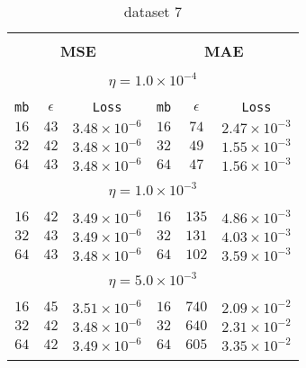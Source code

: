 \begin{table}[]
  \small
  
\begin{center}
\caption{dataset 7}\label{tab:mae2}
\begin{tabular}{@{}ccc|ccc@{}}

\hline\\[-11pt]
\hline\\[-6.5pt]
\multicolumn{3}{c}{\bf MSE} & \multicolumn{3}{c}{\bf MAE } \\[5pt]
\hline\\[-11pt]
\multicolumn{6}{c}{$\eta = 1.0\times 10^{-4}$} \\[5pt]
\hline\\[-11pt]
\texttt{mb} & \texttt{$\epsilon$} & \texttt{Loss} & \texttt{mb} & \texttt{$\epsilon$} & \texttt{Loss} \\[1pt]
$16$ & $43$ & $3.48\times 10^{-6}$  &   $16$ & $74$ & $2.47\times 10^{-3}$   \\ [1pt]
$32$ & $42$ & $3.48\times 10^{-6}$  &   $32$ & $49$ & $1.55\times 10^{-3}$   \\ [1pt]
$64$ & $43$ & $3.48\times 10^{-6}$  &   $64$ & $47$ & $1.56\times 10^{-3}$   \\ [1pt]

\hline\\[-11pt]
\multicolumn{6}{c}{$\eta = 1.0\times 10^{-3}$} \\[5pt]
\hline\\[-11pt]
$16$ & $42$ & $3.49\times 10^{-6}$  &   $16$ & $135$ & $4.86\times 10^{-3}$  \\ [1pt]
$32$ & $43$ & $3.49\times 10^{-6}$  &   $32$ & $131$ & $4.03\times 10^{-3}$  \\ [1pt]
$64$ & $43$ & $3.48\times 10^{-6}$  &   $64$ & $102$ & $3.59\times 10^{-3}$  \\ [1pt]
\hline\\[-11pt]
\multicolumn{6}{c}{$\eta = 5.0\times 10^{-3}$} \\[5pt]
\hline\\[-11pt]
$16$ & $45$ & $3.51\times 10^{-6}$  &   $16$ & $740$ & $2.09\times 10^{-2}$  \\ [1pt]
$32$ & $42$ & $3.48\times 10^{-6}$  &   $32$ & $640$ & $2.31\times 10^{-2}$  \\ [1pt]
$64$ & $42$ & $3.49\times 10^{-6}$  &   $64$ & $605$ & $3.35\times 10^{-2}$  \\ [1pt]

\hline\\[-11pt]


\end{tabular}
\end{center}
\end{table}
